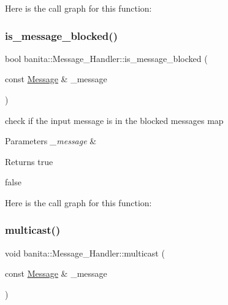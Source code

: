 Here is the call graph for this function\+:
\mbox{\label{classbanita_1_1_message___handler_a9aa44b5857d36ea645f7c1d6631f299e}} 
\subsubsection{\texorpdfstring{is\_message\_blocked()}{is\_message\_blocked()}}
{\footnotesize\ttfamily bool banita\+::\+Message\+\_\+\+Handler\+::is\+\_\+message\+\_\+blocked (\begin{DoxyParamCaption}\item[{const \mbox{\hyperlink{classbanita_1_1_message}{Message}} \&}]{\+\_\+message }\end{DoxyParamCaption})\hspace{0.3cm}{\ttfamily [inline]}}



check if the input message is in the blocked messages map 


\begin{DoxyParams}{Parameters}
{\em \+\_\+message} & \\
\hline
\end{DoxyParams}
\begin{DoxyReturn}{Returns}
true 

false 
\end{DoxyReturn}
Here is the call graph for this function\+:
\mbox{\label{classbanita_1_1_message___handler_a66509928c2131bf12c35192aead8c327}} 
\subsubsection{\texorpdfstring{multicast()}{multicast()}}
{\footnotesize\ttfamily void banita\+::\+Message\+\_\+\+Handler\+::multicast (\begin{DoxyParamCaption}\item[{const \mbox{\hyperlink{classbanita_1_1_message}{Message}} \&}]{\+\_\+message }\end{DoxyParamCaption})}



